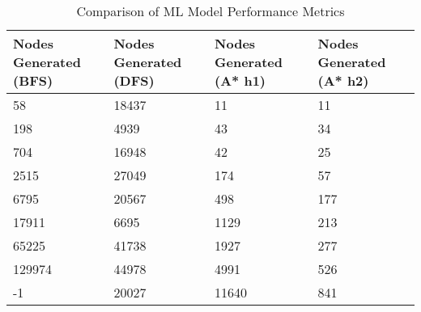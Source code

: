 \begin{table}[htbp]
\caption{Comparison of ML Model Performance Metrics}
\label{tab:model_comparison}
\begin{tabular}{|l|l|l|l|}
\toprule
Nodes Generated (BFS) & Nodes Generated (DFS) & Nodes Generated (A* h1) & Nodes Generated (A* h2) \\
\midrule
58 & 18437 & 11 & 11 \\
198 & 4939 & 43 & 34 \\
704 & 16948 & 42 & 25 \\
2515 & 27049 & 174 & 57 \\
6795 & 20567 & 498 & 177 \\
17911 & 6695 & 1129 & 213 \\
65225 & 41738 & 1927 & 277 \\
129974 & 44978 & 4991 & 526 \\
-1 & 20027 & 11640 & 841 \\
\bottomrule
\end{tabular}
\end{table}
